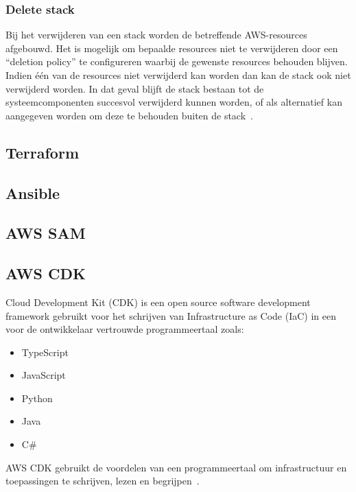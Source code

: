 \subsubsection{Delete stack}

Bij het verwijderen van een stack worden de betreffende AWS-resources afgebouwd.
Het is mogelijk om bepaalde resources niet te verwijderen door een “deletion policy” te configureren waarbij de gewenste resources behouden blijven.
Indien één van de resources niet verwijderd kan worden dan kan de stack ook niet verwijderd worden.
In dat geval blijft de stack bestaan tot de systeemcomponenten succesvol verwijderd kunnen worden, of als alternatief kan aangegeven worden om deze te behouden buiten de stack~\autocite{AWSCLoudformationUser}.

\subsection{Terraform}
\label{subsec:service-terraform}

\subsection{Ansible}
\label{subsec:service-ansible}

\subsection{AWS SAM}
\label{subsec:service-sam}

\subsection{AWS CDK}
\label{subsec:service-cdk}

Cloud Development Kit (CDK) is een open source software development framework gebruikt voor het schrijven van Infrastructure as Code (IaC) in een voor de ontwikkelaar vertrouwde programmeertaal zoals:

\begin{itemize}
    \item TypeScript
    \item JavaScript
    \item Python
    \item Java
    \item C\#
\end{itemize}

AWS CDK gebruikt de voordelen van een programmeertaal om infrastructuur en toepassingen te schrijven, lezen en begrijpen~\autocite{Mansoor2014}.

